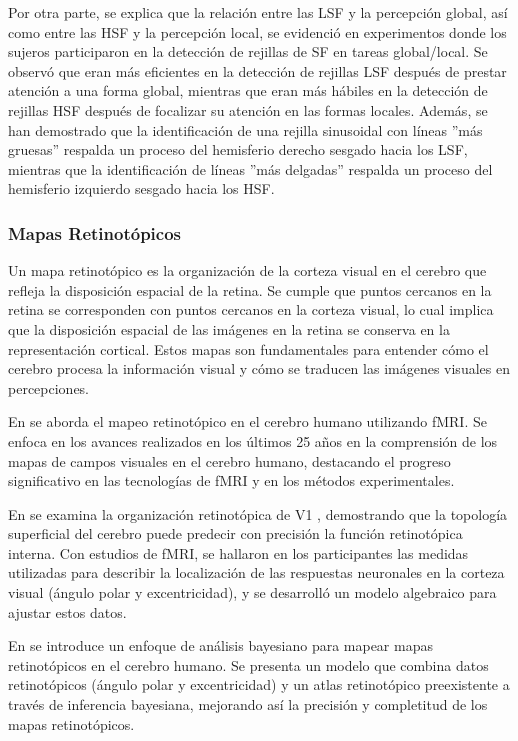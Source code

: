 Por otra parte, se explica que la relación entre las LSF y la percepción global, así como entre las HSF y la percepción local, se evidenció en experimentos donde los sujeros participaron en la detección de rejillas de SF en tareas global/local. Se observó que eran más eficientes en la detección de rejillas LSF después de prestar atención a una forma global, mientras que eran más hábiles en la detección de rejillas HSF después de focalizar su atención en las formas locales. Además, se han demostrado que la identificación de una rejilla sinusoidal con líneas ''más gruesas'' respalda un proceso del hemisferio derecho sesgado hacia los LSF, mientras que la identificación de líneas ''más delgadas'' respalda un proceso del hemisferio izquierdo sesgado hacia los HSF. 



\subsubsection*{Mapas Retinot\'opicos}
Un mapa retinotópico es la organización de la corteza visual en el cerebro que refleja la disposición espacial de la retina. Se cumple que puntos cercanos en la retina se corresponden con puntos cercanos en la corteza visual, lo cual implica que la disposición espacial de las imágenes en la retina se conserva en la representación cortical. Estos mapas son fundamentales para entender cómo el cerebro procesa la información visual y cómo se traducen las imágenes visuales en percepciones.

En \cite{wandell_imaging_2011} se aborda el mapeo retinotópico en el cerebro humano utilizando fMRI. Se enfoca en los avances realizados en los últimos 25 años en la comprensión de los mapas de campos visuales en el cerebro humano, destacando el progreso significativo en las tecnologías de fMRI y en los métodos experimentales.

En \cite{benson_retinotopic_2012} se examina la organización retinotópica de V1 , demostrando que la topología superficial del cerebro puede predecir con precisión la función retinotópica interna. Con estudios de fMRI, se hallaron en los participantes las medidas utilizadas para describir la localización de las respuestas neuronales en la corteza visual (ángulo polar y excentricidad), y se desarroll\'o un modelo algebraico para ajustar estos datos. 

En \cite{benson_bayesian_2018} se introduce un enfoque de análisis bayesiano para mapear mapas retinotópicos en el cerebro humano. Se presenta un modelo que combina datos retinotópicos (ángulo polar y excentricidad) y un atlas retinotópico preexistente a través de inferencia bayesiana, mejorando así la precisión y completitud de los mapas retinotópicos. 


